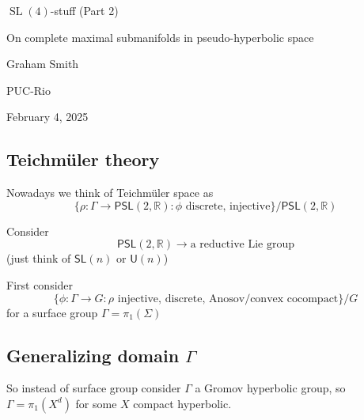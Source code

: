 \clearpage

{\Huge  $\operatorname{SL}(4)$-stuff (Part 2)}

{\Large On complete maximal submanifolds in pseudo-hyperbolic space} 


\hfill{\Large Graham Smith}

{\Large \hfill PUC-Rio}

\hfill{\large February 4, 2025}

\subsection{Teichmüler theory}

Nowadays we think of Teichmüler space as
\[\{ \rho: \Gamma\to \mathsf{PSL}(2,\mathbb{R}): \phi \text{ discrete, injective} \} \Big/ \mathsf{PSL}(2,\mathbb{R})\]

Consider
\[\mathsf{PSL}(2,\mathbb{R})\to \text{a reductive Lie group} \]
(just think of \(\mathsf{SL}(n)\) or \(\mathsf{U}(n)\))

First consider
\[\{\phi:\Gamma \to G:\rho \text{ injective, discrete, Anosov/convex cocompact} \}\Big/G\]
for a surface group \(\Gamma=\pi_{1}(\Sigma)\)

\subsection{Generalizing domain \(\Gamma\)}

So instead of surface group consider \(\Gamma\) a Gromov hyperbolic group, so \(\Gamma=\pi_{1}(X^d)\) for some \(X\) compact hyperbolic.


